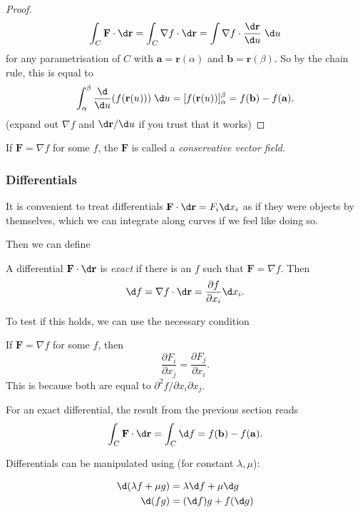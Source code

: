 \documentclass[a4paper]{article}
\begin{document}
\begin{proof}
  \[
    \int_C \mathbf{F}\cdot \d \mathbf{r} = \int_C\nabla f\cdot \d \mathbf{r} = \int \nabla f\cdot \frac{\d \mathbf{r}}{\d u}\; \d u
  \]
  for any parametrisation of $C$ with $\mathbf{a} = \mathbf{r}(\alpha)$ and $\mathbf{b} = \mathbf{r}(\beta)$. So by the chain rule, this is equal to
  \[
    \int_\alpha^\beta \frac{\d }{\d u} (f(\mathbf{r}(u))) \;\d u = [f(\mathbf{r}(u))]_\alpha^\beta = f(\mathbf{b}) - f(\mathbf{a}).
  \]
  (expand out $\nabla f$ and $\d \mathbf{r}/\d u$ if you trust that it works)
\end{proof}

\begin{defi}
  If $\mathbf{F} = \nabla f$ for some $f$, the $\mathbf{F}$ is called a \emph{conservative vector field}.
\end{defi}

\subsubsection{Differentials}
It is convenient to treat differentials $\mathbf{F}\cdot \d \mathbf{r} = F_i \d x_i$ as if they were objects by themselves, which we can integrate along curves if we feel like doing so.

Then we can define
\begin{defi}
  A differential $\mathbf{F}\cdot\d \mathbf{r}$ is \emph{exact} if there is an $f$ such that $\mathbf{F} = \nabla f$. Then
  \[
    \d f = \nabla f\cdot \d \mathbf{r} = \frac{\partial f}{\partial x_i} \d x_i.
  \]
\end{defi}

To test if this holds, we can use the necessary condition
\begin{prop}
  If $\mathbf{F} = \nabla f$ for some $f$, then
  \[
    \frac{\partial F_i}{\partial x_j} = \frac{\partial F_j}{\partial x_i}.
  \]
  This is because both are equal to $\partial^2 f/\partial x_i\partial x_j$.
\end{prop}

For an exact differential, the result from the previous section reads
\[
  \int_C \mathbf{F}\cdot \d \mathbf{r} = \int_C \d f = f(\mathbf{b}) - f(\mathbf{a}).
\]

Differentials can be manipulated using (for constant $\lambda, \mu$):
\begin{prop}
  \begin{align*}
    \d (\lambda f + \mu g) &= \lambda \d f + \mu \d g\\
    \d (fg) &= (\d f)g + f(\d g)
  \end{align*}
\end{prop}
\end{document}
